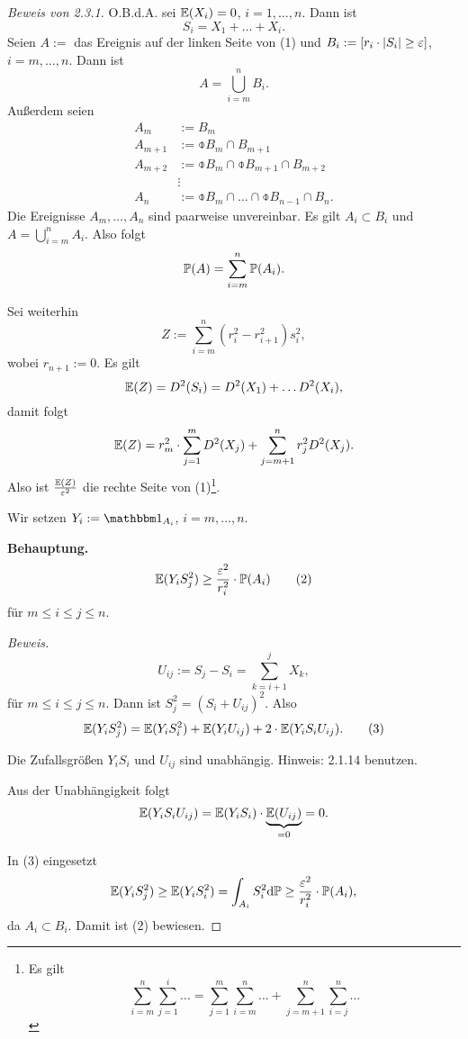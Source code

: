 \begin{proof}[Beweis von 2.3.1]
  O.B.d.A. sei $\mathbb{E}(X_i) = 0$, $i = 1, \ldots, n$.  Dann ist
  \[ S_i = X_1 + \ldots + X_i. \]
  Seien $A := $ das Ereignis auf der linken Seite von (1) und $B_i := [ r_i
  \cdot |S_i| \ge \varepsilon]$, $i = m, \ldots, n$. Dann ist
  \[ A = \bigcup_{i = m}^n B_i. \]
  Außerdem seien
  \begin{align*}
    A_m &:= B_m \\
    A_{m+1} &:= \obar{B}_m \cap B_{m+1} \\
    A_{m+2} &:= \obar{B}_m \cap \obar{B}_{m+1} \cap B_{m+2} \\
         &\vdots \\
    A_n &:= \obar{B}_m \cap \ldots \cap \obar{B}_{n-1} \cap B_n.
  \end{align*}
  Die Ereignisse $A_m, \ldots, A_n$ sind paarweise unvereinbar. Es gilt
  $A_i \subset B_i$ und $A = \bigcup_{i=m}^n A_i$. Also folgt
  \[ \mathbb{P}(A) = \sum_{i=m}^n \mathbb{P}(A_i). \]

  Sei weiterhin
  \[ Z := \sum_{i=m}^n (r_i^2 - r_{i+1}^2) s_i^2, \]
  wobei $r_{n+1} := 0$. Es gilt
  \[ \mathbb{E}(Z) = D^2(S_i) = D^2(X_1) + \ldots D^2(X_i), \]
  damit folgt
  \[ \mathbb{E}(Z) = r_m^2 \cdot \sum_{j=1}^m D^2(X_j) + \sum_{j=m+1}^n r_j^2
    D^2(X_j). \]
  Also ist $\frac{\mathbb{E}(Z)}{\varepsilon^2}$ die rechte Seite von (1)\footnote{%
    Es gilt
    \[ \sum_{i=m}^n \sum_{j=1}^i \ldots = \sum_{j=1}^m \sum_{i=m}^n \ldots +
      \sum_{j=m+1}^n \sum_{i=j}^n \ldots \]
  }.

  Wir setzen  $Y_i := \ind_{A_i}$, $i = m, \ldots, n$.

  \textbf{Behauptung.}
  \[ \mathbb{E}( Y_i S_j^2 ) \ge \frac{\varepsilon^2}{r_i^2} \cdot \mathbb{P}(A_i) \tag{2} \]
  für $m \le i \le j \le n$.

  \textit{Beweis.}
  \[ U_{ij} := S_j - S_i = \sum_{k=i+1}^j X_k, \]
  für $m \le i \le j \le n$. Dann ist $S_j^2 = (S_i + U_{ij})^2$. Also
  \[ \mathbb{E}(Y_i S_j^2) = \mathbb{E}(Y_i S_i^2) + \mathbb{E}(Y_i U_{ij}) + 2 \cdot \mathbb{E}(Y_i S_i
    U_{ij}). \tag{3} \]

  \begin{prgp}[Aufgabe]
    Die Zufallsgrößen $Y_i S_i$ und $U_{ij}$ sind unabhängig. Hinweis: 2.1.14
    benutzen.
  \end{prgp}

  Aus der Unabhängigkeit folgt
  \[ \mathbb{E}(Y_i S_i U_{ij}) = \mathbb{E}(Y_i S_i) \cdot \underbrace{\mathbb{E}(U_{ij})}_{=0} =
    0. \]

  In (3) eingesetzt
  \[ \mathbb{E}( Y_i S_j^2 ) \ge \mathbb{E}(Y_i S_i^2) = \int_{A_i} S_i^2 \mathrm{d} \mathbb{P} \ge
    \frac{\varepsilon^2}{r_i^2} \cdot \mathbb{P}(A_i), \]
  da $A_i \subset B_i$. Damit ist (2) bewiesen.


\end{proof}
